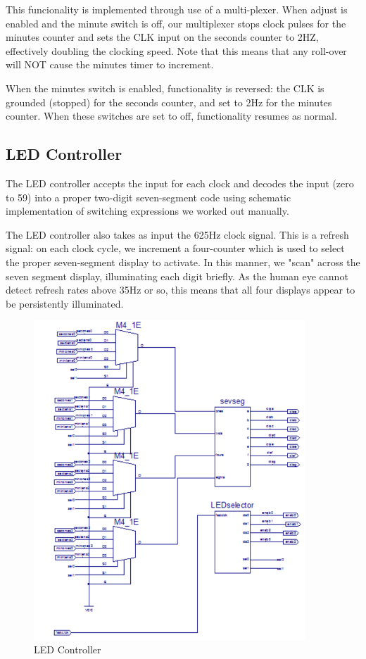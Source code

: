 \documentclass[paper=letter, fontsize=11pt]{scrartcl}
\begin{document}
This funcionality is implemented through use of a multi-plexer. When adjust is enabled and the minute switch is off, our multiplexer stops clock pulses for the minutes counter and sets the CLK input on the seconds counter to 2HZ, effectively doubling the clocking speed. Note that this means that any roll-over will NOT cause the minutes timer to increment.

When the minutes switch is enabled, functionality is reversed: the CLK is grounded (stopped) for the seconds counter, and set to 2Hz for the minutes counter. When these switches are set to off, functionality resumes as normal.

\subsection{LED Controller}
The LED controller accepts the input for each clock and decodes the input (zero to 59) into a proper two-digit seven-segment code using schematic implementation of switching expressions we worked out manually.

The LED controller also takes as input the 625Hz clock signal. This is a refresh signal: on each clock cycle, we increment a four-counter which is used to select the proper seven-segment display to activate. In this manner, we "scan" across the seven segment display, illuminating each digit briefly. As the human eye cannot detect refresh rates above 35Hz or so, this means that all four displays appear to be persistently illuminated.

\begin{figure}[H]
\includegraphics[height=120mm]{led.PNG}
\centering
\caption{LED Controller}
\label{overflow}
\end{figure}
\end{document}

